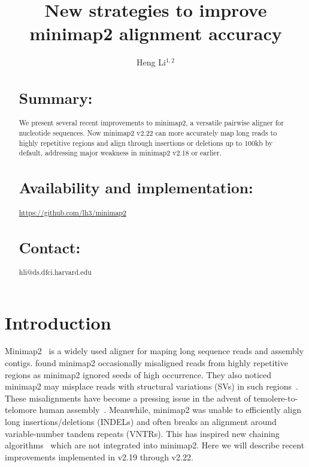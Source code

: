 \documentclass{bioinfo}
\begin{document}

\title[Improvements to minimap2]{New strategies to improve minimap2 alignment accuracy}
\author[Li]{Heng Li$^{1,2}$}
\address{$^1$Dana-Farber Cancer Institute, 450 Brookline Ave, Boston, MA 02215, USA,
$^2$Harvard Medical School, 10 Shattuck St, Boston, MA 02215, USA}

\maketitle

\begin{abstract}

\section{Summary:} We present several recent improvements to minimap2, a
versatile pairwise aligner for nucleotide sequences. Now minimap2 v2.22 can
more accurately map long reads to highly repetitive regions and align through
insertions or deletions up to 100kb by default, addressing major weakness in
minimap2 v2.18 or earlier.

\section{Availability and implementation:}
\href{https://github.com/lh3/minimap2}{https://github.com/lh3/minimap2}

\section{Contact:} hli@ds.dfci.harvard.edu
\end{abstract}

\section{Introduction}
Minimap2~\citep{Li:2018ab} is a widely used aligner for maping long sequence
reads and assembly contigs. \citet{Jain:2020aa} found minimap2 occasionally
misaligned reads from highly repetitive regions as minimap2 ignored seeds of
high occurrence. They also noticed minimap2 may misplace reads with structural
variations (SVs) in such regions~\citep{Jain2020.11.01.363887}. These
misalignments have become a pressing issue in the advent of
temolere-to-telomore human assembly~\citep{Miga:2020aa}. Meanwhile, minimap2
was unable to efficiently align long insertions/deletions (INDELs) and often
breaks an alignment around variable-number tandem repeats (VNTRs). This has
inspired new chaining algorithms~\citep{Li:2020aa,Ren:2021aa} which are not
integrated into minimap2. Here we will describe recent improvements implemented
in v2.19 through v2.22.
\end{document}
